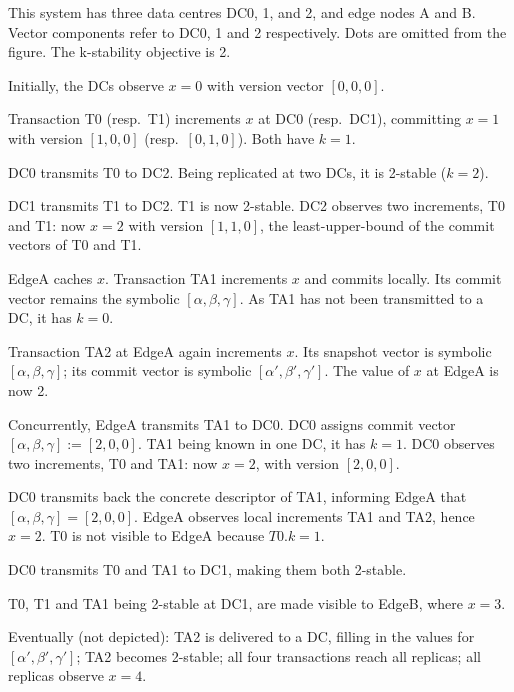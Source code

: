 

This system has three data centres DC0, 1, and 2, and edge nodes A and B.  Vector components refer to DC0, 1 and 2 respectively.  Dots are omitted from the figure.  The k-stability objective is 2.
\begin{description}[leftmargin=!,labelwidth=\widthof{\bfseries \refevent{txn:T0T1TA1:EdgeB}}]
\item[\refevent{txn:init}] Initially, the DCs observe $x=0$ with version vector $[0,0,0]$.
\item[\refevent{txn:T0}, \refevent{txn:T1}] Transaction T0 (resp.\ T1) increments $x$ at DC0 (resp.\ DC1), committing $x=1$ with version $[1,0,0]$ (resp.\ $[0,1,0]$).  Both have $k=1$.
\item[\refevent{txn:T0:DC2}] DC0 transmits T0 to DC2.  Being replicated at two DCs, it is 2-stable ($k=2$).
\item[\refevent{txn:T1:DC2}] DC1 transmits T1 to DC2.  T1 is now 2-stable. DC2 observes two increments, T0 and T1: now $x=2$ with version $[1,1,0]$, the least-upper-bound of the commit vectors of T0 and T1.
\item[\refevent{txn:TA1}] EdgeA caches $x$.  Transaction TA1 increments $x$ and commits locally.  Its commit vector remains the symbolic $[\alpha,\beta,\gamma]$.  As TA1 has not been transmitted to a DC, it has $k=0$.
\item[\refevent{txn:TA2}] Transaction TA2 at EdgeA again increments $x$.  Its snapshot vector is symbolic $[\alpha,\beta,\gamma]$; its commit vector is symbolic $[\alpha',\beta',\gamma']$.  The value of $x$ at EdgeA is now 2.
\item [\refevent{txn:TA1:DC0}] Concurrently, EdgeA transmits TA1 to DC0.  DC0 assigns commit vector $[\alpha,\beta,\gamma] := [2,0,0]$.  TA1 being known in one DC, it has $k=1$.  DC0 observes two increments, T0 and TA1: now $x=2$, with version $[2,0,0]$.
\item [\refevent{txn:TA1:ack}] DC0 transmits back the concrete descriptor of TA1, informing   EdgeA that $[\alpha,\beta,\gamma] = [2,0,0]$.  EdgeA observes local increments TA1 and TA2, hence $x=2$.  T0 is not visible to EdgeA because $T0.k=1$.
\item [\refevent{txn:T0TA1:DC1}] DC0 transmits T0 and TA1 to DC1, making them both 2-stable.
\item [\refevent{txn:T0T1TA1:EdgeB}] T0, T1 and TA1 being 2-stable at DC1, are made visible to EdgeB, where $x=3$.
\end{description}
Eventually (not depicted): TA2 is delivered to a DC, filling in the values for $[\alpha',\beta',\gamma']$; TA2 becomes 2-stable; all four transactions reach all replicas; all replicas observe $x=4$.
